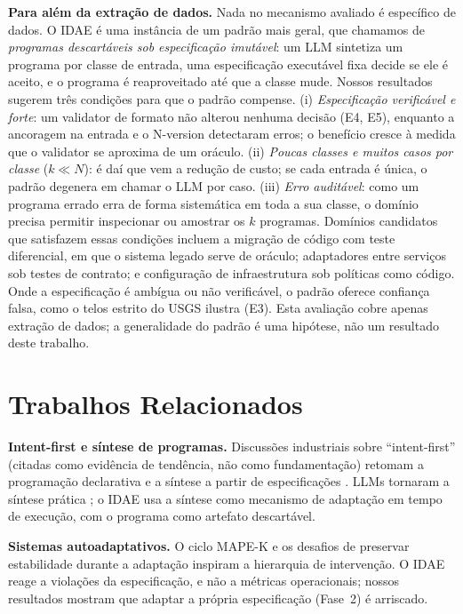 \documentclass[sigconf,nonacm]{acmart}
\begin{document}
\textbf{Para além da extração de dados.} Nada no mecanismo avaliado é específico de dados. O IDAE é uma instância de um padrão mais geral, que chamamos de \textit{programas descartáveis sob especificação imutável}: um LLM sintetiza um programa por classe de entrada, uma especificação executável fixa decide se ele é aceito, e o programa é reaproveitado até que a classe mude. Nossos resultados sugerem três condições para que o padrão compense. (i) \textit{Especificação verificável e forte}: um validator de formato não alterou nenhuma decisão (E4, E5), enquanto a ancoragem na entrada e o N-version detectaram erros; o benefício cresce à medida que o validator se aproxima de um oráculo. (ii) \textit{Poucas classes e muitos casos por classe} ($k \ll N$): é daí que vem a redução de custo; se cada entrada é única, o padrão degenera em chamar o LLM por caso. (iii) \textit{Erro auditável}: como um programa errado erra de forma sistemática em toda a sua classe, o domínio precisa permitir inspecionar ou amostrar os $k$ programas. Domínios candidatos que satisfazem essas condições incluem a migração de código com teste diferencial, em que o sistema legado serve de oráculo; adaptadores entre serviços sob testes de contrato; e configuração de infraestrutura sob políticas como código. Onde a especificação é ambígua ou não verificável, o padrão oferece confiança falsa, como o telos estrito do USGS ilustra (E3). Esta avaliação cobre apenas extração de dados; a generalidade do padrão é uma hipótese, não um resultado deste trabalho.

\section{Trabalhos Relacionados}

\textbf{Intent-first e síntese de programas.} Discussões industriais sobre ``intent-first'' \cite{shoukry2026future} (citadas como evidência de tendência, não como fundamentação) retomam a programação declarativa \cite{lloyd1994practical} e a síntese a partir de especificações \cite{gulwani2017program}. LLMs tornaram a síntese prática \cite{chen2021evaluating}; o IDAE usa a síntese como mecanismo de adaptação em tempo de execução, com o programa como artefato descartável.

\textbf{Sistemas autoadaptativos.} O ciclo MAPE-K \cite{kephart2003vision} e os desafios de preservar estabilidade durante a adaptação \cite{salehie2009self,cheng2009software} inspiram a hierarquia de intervenção. O IDAE reage a violações da especificação, e não a métricas operacionais; nossos resultados mostram que adaptar a própria especificação (Fase~2) é arriscado.
\end{document}
